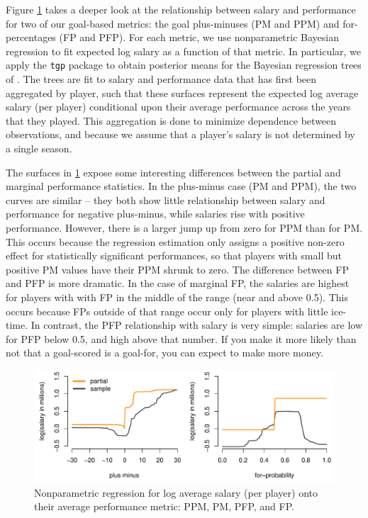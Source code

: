 Figure \ref{fig:salaryreg} takes a deeper look at the relationship between
salary and performance for two of our goal-based metrics: the goal
plus-minuses (PM and PPM) and for-percentages (FP and PFP). For each metric,
we use nonparametric Bayesian regression to fit expected log salary as a
function of that metric.   In particular, we apply the {\tt tgp} package
\cite{gramacy_tgp:_2007,gramacy_categorical_2010} to obtain posterior means
for the Bayesian regression trees of
\cite{chipman_bayesian_2002}.  The trees are fit to salary and performance
data that has first been aggregated by player, such that these surfaces
represent the expected log average salary (per player) conditional upon their
average performance across the years that they played.  This aggregation is
done  to minimize dependence between observations, and because we assume that
a player's salary is not determined by a single season.

The surfaces in \ref{fig:salaryreg} expose some interesting differences
between the partial and marginal performance statistics.  In the plus-minus
case (PM and PPM), the two curves are similar -- they both show little
relationship between salary and performance for negative plus-minus, while
salaries rise with positive performance.   However, there is a larger jump up
from zero for PPM  than for PM.  This occurs because the regression estimation
only assigns a positive non-zero effect for statistically significant
performances, so that players with small but positive PM values have their PPM
shrunk to zero.  The difference between FP and PFP is more dramatic.  In the
case of marginal FP, the salaries are highest for players with with FP in the
middle of the range (near and above 0.5).  This occurs because FPs outside of
that range occur only for players with little ice-time.  In contrast, the PFP
relationship with salary is very simple: salaries are low for PFP below 0.5,
and high above that number.  If you make it more likely than not that a
goal-scored is a goal-for, you can expect to make more money.


\begin{figure}[tbh]
    \centering
    \includegraphics[width=\textwidth]{figures/salreg-goals.pdf}
    \caption{Nonparametric regression for log average salary (per player) onto their average performance metric: PPM, PM, PFP, and FP.  }\label{fig:salaryreg}
\end{figure}

